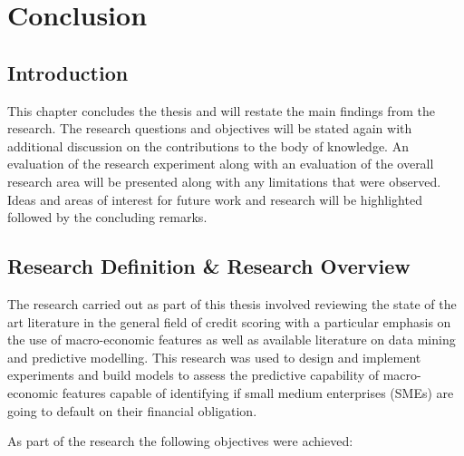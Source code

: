 \chapter{Conclusion} %

\label{Chapter6} %



\section{Introduction}
This chapter concludes the thesis and will restate the main findings from the research. The research questions and objectives will be stated again with additional discussion on the contributions to the body of knowledge. An evaluation of the research experiment along with an evaluation of the overall research area will be presented along with any limitations that were observed. Ideas and areas of interest for future work and research will be highlighted followed by the concluding remarks.

\section{Research Definition \& Research Overview}
The research carried out as part of this thesis involved reviewing the state of the art literature in the general field of credit scoring with a particular emphasis on the use of macro-economic features as well as available literature on data mining and predictive modelling. This research was used to design and implement experiments and build models to assess the predictive capability of macro-economic features capable of identifying if small medium enterprises (SMEs) are going to default on their financial obligation. 

As part of the research the following objectives were achieved:

